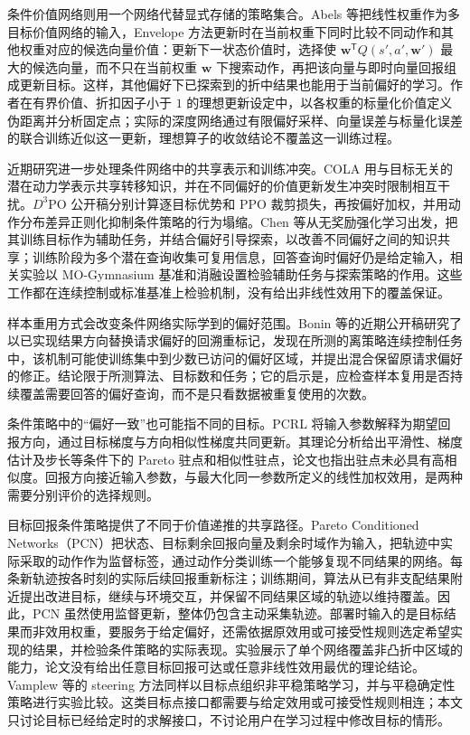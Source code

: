 条件价值网络则用一个网络代替显式存储的策略集合。Abels 等把线性权重作为多目标价值网络的输入\cite{abels2019}，Envelope 方法更新时在当前权重下同时比较不同动作和其他权重对应的候选向量价值\cite{yang2019}：更新下一状态价值时，选择使 $\mathbf w^{\mathsf T}Q(s',a',\mathbf w')$ 最大的候选向量，而不只在当前权重 $\mathbf w$ 下搜索动作，再把该向量与即时向量回报组成更新目标。这样，其他偏好下已探索到的折中结果也能用于当前偏好的学习。作者在有界价值、折扣因子小于 $1$ 的理想更新设定中，以各权重的标量化价值定义伪距离并分析固定点；实际的深度网络通过有限偏好采样、向量误差与标量化误差的联合训练近似这一更新，理想算子的收敛结论不覆盖这一训练过程。

近期研究进一步处理条件网络中的共享表示和训练冲突。COLA 用与目标无关的潜在动力学表示共享转移知识，并在不同偏好的价值更新发生冲突时限制相互干扰\cite{li2025cola}。$D^3$PO 公开稿分别计算逐目标优势和 PPO 裁剪损失，再按偏好加权，并用动作分布差异正则化抑制条件策略的行为塌缩\cite{ambadkar2026d3po}。Chen 等从无奖励强化学习出发，把其训练目标作为辅助任务，并结合偏好引导探索，以改善不同偏好之间的知识共享\cite{chen2026rewardfree}；训练阶段为多个潜在查询收集可复用信息，回答查询时偏好仍是给定输入，相关实验以 MO-Gymnasium 基准和消融设置检验辅助任务与探索策略的作用。这些工作都在连续控制或标准基准上检验机制，没有给出非线性效用下的覆盖保证。

样本重用方式会改变条件网络实际学到的偏好范围。Bonin 等的近期公开稿研究了以已实现结果方向替换请求偏好的回溯重标记，发现在所测的离策略连续控制任务中，该机制可能使训练集中到少数已访问的偏好区域，并提出混合保留原请求偏好的修正\cite{bonin2026collapse}。结论限于所测算法、目标数和任务；它的启示是，应检查样本复用是否持续覆盖需要回答的偏好查询，而不是只看数据被重复使用的次数。

条件策略中的“偏好一致”也可能指不同的目标。PCRL 将输入参数解释为期望回报方向，通过目标梯度与方向相似性梯度共同更新\cite{yang2025pcrl}。其理论分析给出平滑性、梯度估计及步长等条件下的 Pareto 驻点和相似性驻点，论文也指出驻点未必具有高相似度。回报方向接近输入参数，与最大化同一参数所定义的线性加权效用，是两种需要分别评价的选择规则。

目标回报条件策略提供了不同于价值递推的共享路径。Pareto Conditioned Networks（PCN）把状态、目标剩余回报向量及剩余时域作为输入，把轨迹中实际采取的动作作为监督标签，通过动作分类训练一个能够复现不同结果的网络\cite{reymond2022pcn}。每条新轨迹按各时刻的实际后续回报重新标注；训练期间，算法从已有非支配结果附近提出改进目标，继续与环境交互，并保留不同结果区域的轨迹以维持覆盖。因此，PCN 虽然使用监督更新，整体仍包含主动采集轨迹。部署时输入的是目标结果而非效用权重，要服务于给定偏好，还需依据原效用或可接受性规则选定希望实现的结果，并检验条件策略的实际表现。实验展示了单个网络覆盖非凸折中区域的能力，论文没有给出任意目标回报可达或任意非线性效用最优的理论结论。Vamplew 等的 steering 方法同样以目标点组织非平稳策略学习，并与平稳确定性策略进行实验比较\cite{vamplew2017steering}。这类目标点接口都需要与给定效用或可接受性规则相连；本文只讨论目标已经给定时的求解接口，不讨论用户在学习过程中修改目标的情形。


